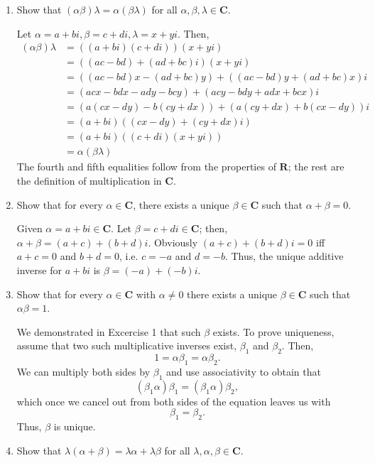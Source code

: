 \documentclass{book}
\begin{document}
\begin{enumerate}
\item Show that \((\alpha\beta)\lambda=\alpha(\beta\lambda)\) for all \(\alpha,\beta,\lambda \in \textbf{C}\).

Let \(\alpha=a+bi,\beta=c+di,\lambda=x+yi\).  Then,
\begin{equation*}
\begin{split}
(\alpha\beta)\lambda &= ((a+bi)(c+di))(x+yi) \\
&= ((ac-bd)+(ad+bc)i)(x+yi) \\
&= ((ac-bd)x-(ad+bc)y)+((ac-bd)y+(ad+bc)x)i \\
&= (acx-bdx-ady-bcy)+(acy-bdy+adx+bcx)i \\
&= (a(cx-dy)-b(cy+dx))+(a(cy+dx)+b(cx-dy))i \\
&= (a+bi)((cx-dy)+(cy+dx)i) \\
&= (a+bi)((c+di)(x+yi)) \\
&= \alpha(\beta\lambda)
\end{split}
\end{equation*}
The fourth and fifth equalities follow from the properties of \(\textbf{R}\); the rest are the definition of multiplication in \(\textbf{C}\).

\item Show that for every \(\alpha \in \textbf{C}\), there exists a unique \(\beta \in \textbf{C}\) such that \(\alpha+\beta=0\).

Given \(\alpha=a+bi \in \textbf{C}\).  Let \(\beta = c+di \in \textbf{C}\); then, \(\alpha+\beta=(a+c)+(b+d)i\).  Obviously \((a+c)+(b+d)i=0\) iff \(a+c=0\) and \(b+d=0\), i.e. \(c=-a\) and \(d=-b\).  Thus, the unique additive inverse for \(a+bi\) is \(\beta=(-a)+(-b)i\).

\item Show that for every \(\alpha \in \textbf{C}\) with \(\alpha \neq 0\) there exists a unique \(\beta \in \textbf{C}\) such that \(\alpha\beta = 1\).

We demonstrated in Excercise 1 that such \(\beta\) exists.  To prove uniqueness, assume that two such multiplicative inverses exist, \(\beta_1\) and \(\beta_2\).  Then, \[1=\alpha\beta_1=\alpha\beta_2.\]  We can multiply both sides by \(\beta_1\) and use associativity to obtain that \[(\beta_1\alpha)\beta_1=(\beta_1\alpha)\beta_2,\] which once we cancel out from both sides of the equation leaves us with \[\beta_1=\beta_2.\]  Thus, \(\beta\) is unique.

\item Show that \(\lambda(\alpha+\beta)=\lambda\alpha+\lambda\beta\) for all \(\lambda,\alpha,\beta \in \textbf{C}\).


\end{enumerate}
\end{document}
